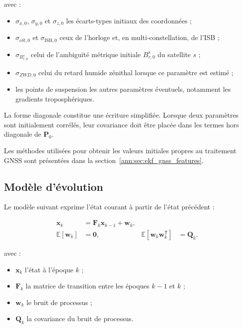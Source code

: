 avec :

\begin{itemize}
    \item $\sigma_{x,0}$, $\sigma_{y,0}$ et $\sigma_{z,0}$ les écarts-types
    initiaux des coordonnées ;
    \item $\sigma_{c\delta t,0}$ et $\sigma_{\mathrm{ISB},0}$ ceux de
    l'horloge et, en multi-constellation, de l'ISB ;
    \item $\sigma_{B_{r,0}^s}$ celui de l'ambiguïté métrique initiale
    $B_{r,0}^s$ du satellite $s$ ;
    \item $\sigma_{ZWD,0}$ celui du retard humide zénithal lorsque ce paramètre
    est estimé ;
    \item les points de suspension les autres paramètres éventuels, notamment
    les gradients troposphériques.
\end{itemize}

La forme diagonale constitue une écriture simplifiée. Lorsque deux paramètres
sont initialement corrélés, leur covariance doit être placée dans les termes
hors diagonale de $\mathbf P_0$. 

Les méthodes utilisées pour
obtenir les valeurs initiales propres au traitement GNSS sont présentées dans
la section~\ref{ann:sec:ekf_gnss_features}.

\subsection{Modèle d'évolution}

Le modèle suivant exprime l'état courant à partir de l'état précédent :

\begin{align}
\mathbf x_k
&=
\mathbf F_k\mathbf x_{k-1}+\mathbf w_k,
\\
\mathbb E[\mathbf w_k]
&=\mathbf0,
&
\mathbb E[\mathbf w_k\mathbf w_k^{\mathsf T}]
&=\mathbf Q_k.
\label{ann:eq:kalman_prediction}
\end{align}

avec :

\begin{itemize}
    \item $\mathbf x_k$ l'état à l'époque $k$ ;
    \item $\mathbf F_k$ la matrice de transition entre les époques $k-1$ et
    $k$ ;
    \item $\mathbf w_k$ le bruit de processus ;
    \item $\mathbf Q_k$ la covariance du bruit de processus.
\end{itemize}

